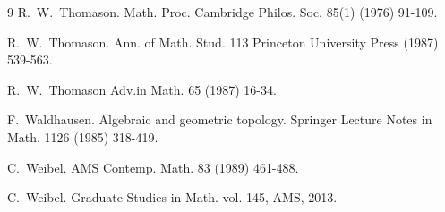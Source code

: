 \documentclass[11pt,twoside]{amsart}
\theoremstyle{definition}
\theoremstyle{remark}
\numberwithin{equation}{section}
\begin{document}
\begin{thebibliography}{9}
R.~W.~Thomason.
\newblock Math. Proc. Cambridge Philos. Soc. 85(1)  (1976)  91-109.

R.~W.~Thomason.
\newblock  Ann. of Math. Stud. 113 Princeton University Press (1987)  539-563.

R.~W.~Thomason
\newblock Adv.in Math. 65 (1987) 16-34.

F.~Waldhausen.
\newblock Algebraic and geometric topology.
Springer Lecture Notes in Math. 1126 (1985) 318-419.

C.~Weibel.
\newblock AMS Contemp. Math. 83 (1989) 461-488.


C.~Weibel.
\newblock Graduate Studies in Math. vol. 145, AMS, 2013.
\end{thebibliography}
\end{document}
